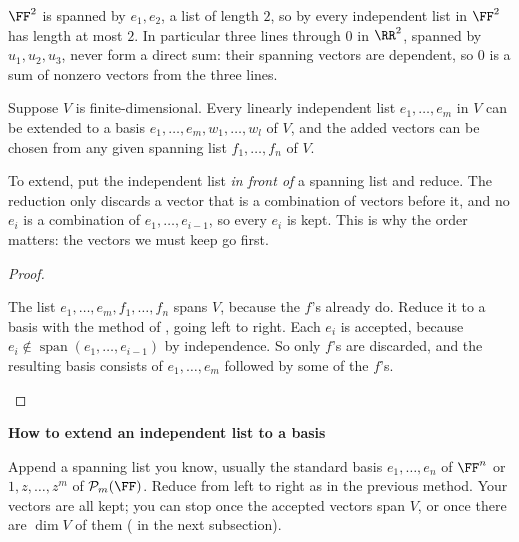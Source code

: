 \documentclass[10pt]{scrartcl}
\DeclareMathOperator{\spn}{span}
\newcommand{\PP}{\mathcal P}
\newenvironment{methodbox}[1]{\begin{mdframed}[style=methodstyle]\textbf{\color{NavyBlue}#1}\par\vspace{2pt}}{\end{mdframed}}
\begin{document}
\begin{example*}
  $\FF^2$ is spanned by $e_1,e_2$, a list of length $2$, so by  every independent list in $\FF^2$ has length at most $2$. In particular three lines through $0$ in $\RR^2$, spanned by $u_1,u_2,u_3$, never form a direct sum: their spanning vectors are dependent, so $0$ is a sum of nonzero vectors from the three lines.
\end{example*}

\begin{proposition*}
  Suppose $V$ is finite-dimensional. Every linearly independent list $e_1,\dots,e_m$ in $V$ can be extended to a basis $e_1,\dots,e_m,w_1,\dots,w_l$ of $V$, and the added vectors can be chosen from any given spanning list $f_1,\dots,f_n$ of $V$.
\end{proposition*}
\begin{ideabox}
  To extend, put the independent list \emph{in front of} a spanning list and reduce. The reduction only discards a vector that is a combination of vectors before it, and no $e_i$ is a combination of $e_1,\dots,e_{i-1}$, so every $e_i$ is kept. This is why the order matters: the vectors we must keep go first.
\end{ideabox}
\begin{proof}
  \begin{steps}
    \ii The list $e_1,\dots,e_m,f_1,\dots,f_n$ spans $V$, because the $f$'s already do.
    \ii Reduce it to a basis with the method of , going left to right. Each $e_i$ is accepted, because $e_i\notin\spn(e_1,\dots,e_{i-1})$ by independence. So only $f$'s are discarded, and the resulting basis consists of $e_1,\dots,e_m$ followed by some of the $f$'s.
  \end{steps}
\end{proof}

\begin{methodbox}{How to extend an independent list to a basis}
  \begin{steps}
    \ii Append a spanning list you know, usually the standard basis $e_1,\dots,e_n$ of $\FF^n$ or $1,z,\dots,z^m$ of $\PP_m(\FF)$.
    \ii Reduce from left to right as in the previous method. Your vectors are all kept; you can stop once the accepted vectors span $V$, or once there are $\dim V$ of them ( in the next subsection).
  \end{steps}
\end{methodbox}
\end{document}
